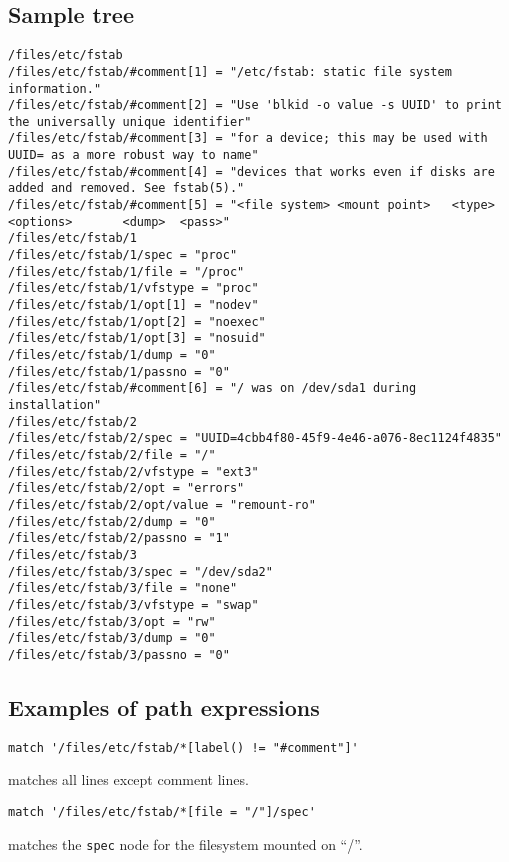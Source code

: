 \subsection{Sample tree}

\begin{verbatim}
/files/etc/fstab
/files/etc/fstab/#comment[1] = "/etc/fstab: static file system information."
/files/etc/fstab/#comment[2] = "Use 'blkid -o value -s UUID' to print the universally unique identifier"
/files/etc/fstab/#comment[3] = "for a device; this may be used with UUID= as a more robust way to name"
/files/etc/fstab/#comment[4] = "devices that works even if disks are added and removed. See fstab(5)."
/files/etc/fstab/#comment[5] = "<file system> <mount point>   <type>  <options>       <dump>  <pass>"
/files/etc/fstab/1
/files/etc/fstab/1/spec = "proc"
/files/etc/fstab/1/file = "/proc"
/files/etc/fstab/1/vfstype = "proc"
/files/etc/fstab/1/opt[1] = "nodev"
/files/etc/fstab/1/opt[2] = "noexec"
/files/etc/fstab/1/opt[3] = "nosuid"
/files/etc/fstab/1/dump = "0"
/files/etc/fstab/1/passno = "0"
/files/etc/fstab/#comment[6] = "/ was on /dev/sda1 during installation"
/files/etc/fstab/2
/files/etc/fstab/2/spec = "UUID=4cbb4f80-45f9-4e46-a076-8ec1124f4835"
/files/etc/fstab/2/file = "/"
/files/etc/fstab/2/vfstype = "ext3"
/files/etc/fstab/2/opt = "errors"
/files/etc/fstab/2/opt/value = "remount-ro"
/files/etc/fstab/2/dump = "0"
/files/etc/fstab/2/passno = "1"
/files/etc/fstab/3
/files/etc/fstab/3/spec = "/dev/sda2"
/files/etc/fstab/3/file = "none"
/files/etc/fstab/3/vfstype = "swap"
/files/etc/fstab/3/opt = "rw"
/files/etc/fstab/3/dump = "0"
/files/etc/fstab/3/passno = "0"
\end{verbatim}

\subsection{Examples of path expressions}

\begin{verbatim}
match '/files/etc/fstab/*[label() != "#comment"]'
\end{verbatim}

matches all lines except comment lines.

\begin{verbatim}
match '/files/etc/fstab/*[file = "/"]/spec'
\end{verbatim}

matches the \verb!spec! node for the filesystem mounted on ``/''.

